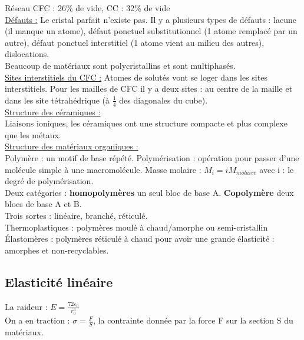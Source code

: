 \documentclass[../main.tex]{subfiles}
\begin{document}
Réseau CFC : 26\% de vide, CC : 32\% de vide\\

\quad \underline{Défauts :}
Le cristal parfait n'existe pas. Il y a plusieurs types de défauts : lacune (il manque un atome), défaut ponctuel substitutionnel (1 atome remplacé par un autre), défaut ponctuel interstitiel (1 atome vient au milieu des autres), dislocations.\\
Beaucoup de matériaux sont polycristallins et sont multiphasés. \\

\quad \underline{Sites interstitiels du CFC :}
Atomes de solutés vont se loger dans les sites interstitiels. Pour les mailles de CFC il y a deux sites : au centre de la maille et dans les site tétrahédrique (à $\frac{1}{4}$ des diagonales du cube).\\

\quad \underline{Structure des céramiques :}\\
Liaisons ioniques, les céramiques ont une structure compacte et plus complexe que les métaux. \\

\quad \underline{Structure des matériaux organiques :}\\
Polymère : un motif de base répété. Polymérisation : opération pour passer d'une molécule simple à une macromolécule. Masse molaire : $M_i = i M_{molaire}$ avec i : le degré de polymérisation.\\

Deux catégories : \textbf{homopolymères} un seul bloc de base A. \textbf{Copolymère} deux blocs de base A et B.\\
Trois sortes : linéaire, branché, réticulé. \\
Thermoplastiques : polymères moulé à chaud/amorphe ou semi-cristallin\\
Élastomères : polymères réticulé à chaud pour avoir une grande élasticité : amorphes et non-recyclables. \\

\subsection{Elasticité linéaire}
La raideur : $E = \frac{72 \varepsilon_0}{r_0^3}$\\

On a en traction : $\sigma = \frac{F}{S}$, la contrainte donnée par la force F sur la section S du matériaux. \\
\end{document}
